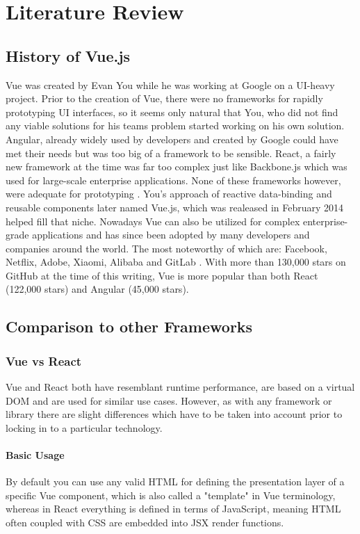 \chapter[Literature Review]{Literature Review}

\section{History of Vue.js}
Vue was created by Evan You while he was working at Google on a UI-heavy project. Prior to the creation of Vue, there were no frameworks for rapidly prototyping UI interfaces, so it seems only natural that You, who did not find any viable solutions for his teams problem started working on his own solution. Angular, already widely used by developers and created by Google could have met their needs but was too big of a framework to be sensible. React, a fairly new framework at the time was far too complex just like Backbone.js which was used for large-scale enterprise applications. None of these frameworks however, were adequate for prototyping \cite[p.~10]{filipova2016learning}. You's approach of reactive data-binding and reusable components later named Vue.js, which was realeased in February 2014 \cite{wiki:Vue} helped fill that niche. Nowadays Vue can also be utilized for complex enterprise-grade applications and has since been adopted by many developers and companies around the world. The most noteworthy of which are: Facebook, Netflix, Adobe, Xiaomi, Alibaba and GitLab \cite{CompaniesUsingVue:online}. With more than 130,000 stars on GitHub at the time of this writing, Vue is more popular than both React (122,000 stars) and Angular (45,000 stars).


\section{Comparison to other Frameworks}

\subsection{Vue vs React}
Vue and React both have resemblant runtime performance, are based on a virtual DOM and are used for similar use cases. However, as with any framework or library there are slight differences which have to be taken into account prior to locking in to a particular technology.

\subsubsection{Basic Usage}
By default you can use any valid HTML for defining the presentation layer of a specific Vue component, which is also called a "template" in Vue terminology, whereas in React everything is defined in terms of JavaScript, meaning HTML often coupled with CSS are embedded into JSX render functions.

